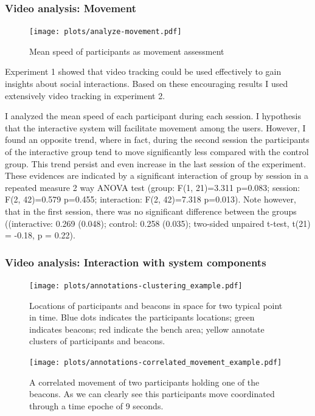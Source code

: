 \documentclass[a4paper,11pt]{article}
\begin{document}
\subsubsection{Video analysis: Movement}

\begin{figure}[!htb]
    \centering
    \texttt{[image: plots/analyze-movement.pdf]}
    \caption{Mean speed of participants as movement assessment}\label{plot:analyze-movement}
\end{figure}

Experiment 1 showed that video tracking could be used effectively to gain insights about social interactions.
Based on these encouraging results I used extensively video tracking in experiment 2.

I analyzed the mean speed of each participant during each session.
I hypothesis that the interactive system will facilitate movement among the users.
However, I found an opposite trend, where in fact, during the second session the participants of the interactive group tend to move significantly less compared with the control group.
This trend persist and even increase in the last session of the experiment.
These evidences are indicated by a significant interaction of group by session in a repeated measure 2 way ANOVA test (group: F(1, 21)=3.311 p=0.083; session: F(2, 42)=0.579 p=0.455; interaction: F(2, 42)=7.318 p=0.013).
Note however, that in the first session, there was no significant difference between the groups ((interactive: 0.269 (0.048); control: 0.258 (0.035); two-sided unpaired t-test, t(21) = -0.18, p = 0.22).

\subsubsection{Video analysis: Interaction with system components}\label{results:system}

\begin{figure}[!htb]
    \centering
    \texttt{[image: plots/annotations-clustering\_example.pdf]}
    \caption{Locations of participants and beacons in space for two typical point in time. Blue dots indicates the participants locations; green indicates beacons; red indicate the bench area; yellow annotate clusters of participants and beacons.}\label{plot:annotations-clustering_example}
\end{figure}

\begin{figure}[!htb]
    \centering
    \texttt{[image: plots/annotations-correlated\_movement\_example.pdf]}
    \caption{A correlated movement of two participants holding one of the beacons. As we can clearly see this participants move coordinated through a time epoche of 9 seconds.}\label{plot:annotations-correlated_movement_example}
\end{figure}
\end{document}

